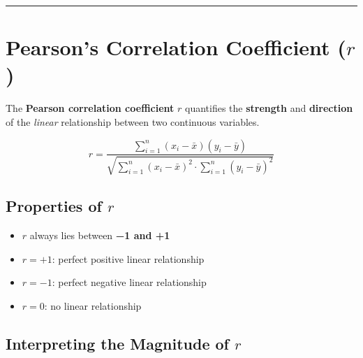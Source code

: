 \documentclass[
  12pt,
  letterpaper,
]{book}
\providecommand{\tightlist}{%
  \setlength{\itemsep}{0pt}\setlength{\parskip}{0pt}}
\begin{document}
\begin{center}\rule{0.5\linewidth}{0.5pt}\end{center}

\section{\texorpdfstring{Pearson's Correlation Coefficient
(\(r\))}{Pearson's Correlation Coefficient (r)}}\label{pearsons-correlation-coefficient-r}

The \textbf{Pearson correlation coefficient} \(r\) quantifies the
\textbf{strength} and \textbf{direction} of the \emph{linear}
relationship between two continuous variables.

\[r = \frac{\sum_{i=1}^{n}(x_i - \bar{x})(y_i - \bar{y})}
           {\sqrt{\sum_{i=1}^{n}(x_i-\bar{x})^2 \cdot \sum_{i=1}^{n}(y_i-\bar{y})^2}}\]

\subsection{\texorpdfstring{Properties of
\(r\)}{Properties of r}}\label{properties-of-r}

\begin{itemize}
\tightlist
\item
  \(r\) always lies between \textbf{−1 and +1}
\item
  \(r = +1\): perfect positive linear relationship
\item
  \(r = -1\): perfect negative linear relationship
\item
  \(r = 0\): no linear relationship
\end{itemize}

\subsection{\texorpdfstring{Interpreting the Magnitude of
\(r\)}{Interpreting the Magnitude of r}}\label{interpreting-the-magnitude-of-r}
\end{document}
